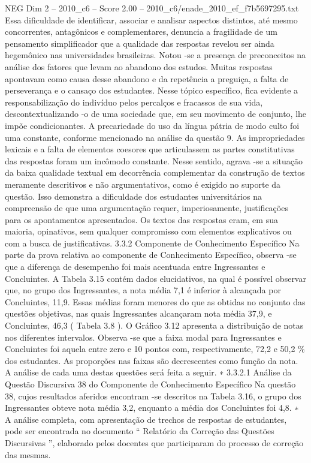 \begin{textsample}{NEG Dim 2 – 2010\_c6 – Score 2.00 – 2010\_c6/enade\_2010\_ef\_f7b5697295.txt}
Essa dificuldade de identificar, associar e analisar aspectos distintos, até mesmo concorrentes, antagônicos e complementares, denuncia a fragilidade de um pensamento simplificador que a qualidade das respostas revelou ser ainda hegemônico nas universidades brasileiras.
Notou -se a presença de preconceitos na análise dos fatores que levam ao abandono dos estudos.
Muitas respostas apontavam como causa desse abandono e da repetência a preguiça, a falta de perseverança e o cansaço dos estudantes.
Nesse tópico específico, fica evidente a responsabilização do indivíduo pelos percalços e fracassos de sua vida, descontextualizando -o de uma sociedade que, em seu movimento de conjunto, lhe impõe condicionantes.
A precariedade do uso da língua pátria de modo culto foi uma constante, conforme mencionado na análise da questão 9.
As impropriedades lexicais e a falta de elementos coesores que articulassem as partes constitutivas das respostas foram um incômodo constante.
Nesse sentido, agrava -se a situação da baixa qualidade textual em decorrência complementar da construção de textos meramente descritivos e não argumentativos, como é exigido no suporte da questão.
Isso demonstra a dificuldade dos estudantes universitários na compreensão de que uma argumentação requer, imperiosamente, justificações para os apontamentos apresentados.
Os textos das respostas eram, em sua maioria, opinativos, sem qualquer compromisso com elementos explicativos ou com a busca de justificativas. 3.3.2 Componente de Conhecimento Específico Na parte da prova relativa ao componente de Conhecimento Específico, observa -se que a diferença de desempenho foi mais acentuada entre Ingressantes e Concluintes.
A Tabela 3.15 contém dados elucidativos, na qual é possível observar que, no grupo dos Ingressantes, a nota média 7,1 é inferior à alcançada por Concluintes, 11,9.
Essas médias foram menores do que as obtidas no conjunto das questões objetivas, nas quais Ingressantes alcançaram nota média 37,9, e Concluintes, 46,3 ( Tabela 3.8 ).
O Gráfico 3.12 apresenta a distribuição de notas nos diferentes intervalos.
Observa -se que a faixa modal para Ingressantes e Concluintes foi aquela entre zero e 10 pontos com, respectivamente, 72,2 e 50,2 \% dos estudantes.
As proporções nas faixas são decrescentes como função da nota.
A análise de cada uma destas questões será feita a seguir. ∗ 3.3.2.1 Análise da Questão Discursiva 38 do Componente de Conhecimento Específico Na questão 38, cujos resultados aferidos encontram -se descritos na Tabela 3.16, o grupo dos Ingressantes obteve nota média 3,2, enquanto a média dos Concluintes foi 4,8. ∗ A análise completa, com apresentação de trechos de respostas de estudantes, pode ser encontrada no documento “ Relatório da Correção das Questões Discursivas ”, elaborado pelos docentes que participaram do processo de correção das mesmas.

\end{textsample}
